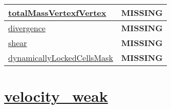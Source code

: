 {\begin{center}
\begin{longtable}{| p{2.0in} | p{4.0in} |}
    \hline
    \hyperref[subsec:var_sec_velocity_solver_totalMassVertexfVertex]{totalMassVertexfVertex} & {\bf \color{red} MISSING} \\
    \hline
    \hyperref[subsec:var_sec_velocity_solver_divergence]{divergence} & {\bf \color{red} MISSING} \\
    \hline
    \hyperref[subsec:var_sec_velocity_solver_shear]{shear} & {\bf \color{red} MISSING} \\
    \hline
    \hyperref[subsec:var_sec_velocity_solver_dynamicallyLockedCellsMask]{dynamicallyLockedCellsMask} & {\bf \color{red} MISSING} \\
    \hline
\end{longtable}
\end{center}
}
\section[velocity\_weak]{\hyperref[sec:var_sec_velocity_weak]{velocity\_weak}}
\label{sec:var_tab_velocity_weak}
\vspace{0.5in}
